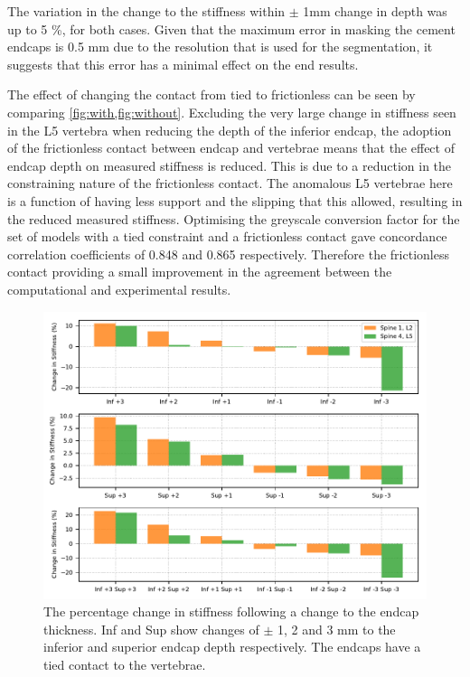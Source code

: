 The variation in the change to the stiffness within $\pm$ 1mm change in depth
was up to 5 \%, for both cases.
Given that the maximum error in masking the cement endcaps is 0.5 mm due to the
resolution that is used for the segmentation, it suggests that this error has a
minimal effect on the end results.

The effect of changing the contact from tied to frictionless can be seen by
comparing \cref{fig:with,fig:without}.
Excluding the very large change in stiffness seen in the L5 vertebra when
reducing the depth of the inferior endcap, the adoption of the frictionless
contact between endcap and vertebrae means that the effect of endcap depth on
measured stiffness is reduced.
This is due to a reduction in the constraining nature of the frictionless
contact.
The anomalous L5 vertebrae here is a function of having less support and the
slipping that this allowed, resulting in the reduced measured stiffness.
Optimising the greyscale conversion factor for the set of models with a tied
constraint and a frictionless contact gave concordance correlation coefficients
of 0.848 and 0.865 respectively.
Therefore the frictionless contact providing a small improvement in the
agreement between the computational and experimental results.





\begin{figure}[h!]
\centering
\includegraphics[width=\textwidth]{Chapters/Chapter_HT_images/with.pdf}
\caption{The percentage change in stiffness following a change to the endcap
thickness. Inf and Sup show changes of $\pm$ 1, 2 and 3 mm to the inferior and
superior endcap depth respectively. The endcaps have a tied contact to the
vertebrae.}
\label{fig:with}
\end{figure}


